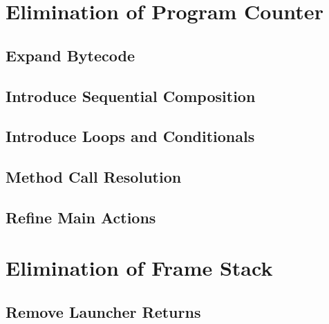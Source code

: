 \section{Elimination of Program Counter}

\subsection{Expand Bytecode}



\pagebreak

\subsection{Introduce Sequential Composition}



\pagebreak

\subsection{Introduce Loops and Conditionals}



\pagebreak

\subsection{Method Call Resolution}



\pagebreak

\subsection{Refine Main Actions}



\pagebreak

\section{Elimination of Frame Stack}

\subsection{Remove Launcher Returns}

